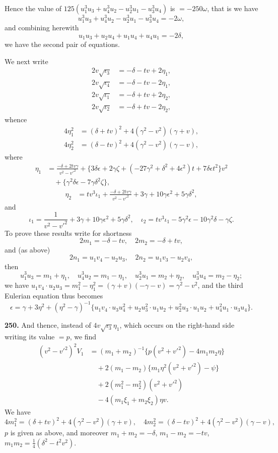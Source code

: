 \documentclass[12pt,a4paper]{article}
\theoremstyle{definition}
\begin{document}
Hence the value of $125(u_1^3u_3 + u_4^3u_2 - u_2^3u_1 - u_3^3u_4)$ is $= -250\omega$, that is we have
\[
u_1^3u_3 + u_4^3u_2 - u_2^3u_1 - u_3^3u_4 = -2\omega,\]
and combining herewith
\[
u_1u_3 + u_2u_4 + u_1u_4 + u_4u_1 = -2\delta,\]
we have the second pair of equations.

We next write
\begin{align*}
2v\sqrt{\iota_3} &= -\delta - tv + 2\eta_1,\\
2v\sqrt{\iota_4} &= -\delta - tv - 2\eta_1,\\
2v\sqrt{\iota_1} &= -\delta + tv + 2\eta_2,\\
2v\sqrt{\iota_2} &= -\delta + tv - 2\eta_2,
\end{align*}
whence
\begin{align*}
4\eta_1^2 &= (\delta + tv)^2 + 4(\gamma^2 - v^2)(\gamma + v),\\
4\eta_2^2 &= (\delta - tv)^2 + 4(\gamma^2 - v^2)(\gamma - v),
\end{align*}
where
\begin{align*}
\eta_1 &= \frac{-\delta + 2tv\gamma}{v^2 - v'^2} + \{3\delta\epsilon + 2\gamma\zeta + (-27\gamma^2 + \delta^2 + 4\epsilon^2)t + 7\delta\epsilon t^2\}v^2 \\
&\quad + \{\gamma^2\delta\epsilon - 7\gamma\delta^2\zeta\},
\end{align*}
\begin{align*}
\eta_2 &= tv^3\iota_1 + \frac{-\delta + 2tv\gamma}{v^2 - v'^2} + 3\gamma + 10\gamma\epsilon^2 + 5\gamma\delta^2,
\end{align*}
and
\[
\iota_1 = \frac{1}{v^2 - v'^2} + 3\gamma + 10\gamma\epsilon^2 + 5\gamma\delta^2,\quad
\iota_2 = tv^3\iota_1 - 5\gamma^2\epsilon - 10\gamma^2\delta - \gamma\zeta.
\]
To prove these results write for shortness
\[
2m_1 = -\delta - tv,\quad 2m_2 = -\delta + tv,
\]
and (as above)
\[
2n_1 = u_1v_4 - u_2u_3,\quad 2n_2 = u_1v_3 - u_2v_4,
\]
then
\[
u_1^3u_3 = m_1 + \eta_1,\quad u_4^3u_2 = m_1 - \eta_1,\quad u_2^3u_1 = m_2 + \eta_2,\quad u_3^3u_4 = m_2 - \eta_2;\]
we have $u_1v_4 \cdot u_2u_3 = m_1^2 - \eta_1^2 = (\gamma + v)(-\gamma - v) = \gamma^2 - v^2$, and the third Eulerian equation thus becomes
\[
\epsilon = \gamma + 3\eta^2 + (\eta^2 - \gamma)^{-1}\{u_1v_4 \cdot u_3u_4^2 + u_2u_3^2 \cdot u_1u_2 + u_2^2u_3 \cdot u_1u_2 + u_4^2u_1 \cdot u_3u_4\}.
\]

\vspace{0.5em}

\noindent\textbf{250.} And thence, instead of $4v\sqrt{\iota_3}\eta_1$, which occurs on the right-hand side writing its value $= p$, we find
\begin{align*}
(v^2 - v'^2)^2 V_1 &= (m_1 + m_2)^{-1}\{p(v^2 + v'^2) - 4m_1m_2\eta\} \\
&\quad + 2(m_1 - m_2)\{m_1\eta^2(v^2 + v'^2) - \psi\} \\
&\quad + 2(m_1^2 - m_2^2)(v^2 + v'^2) \\
&\quad - 4(m_1\xi_1 + m_2\xi_2)\eta v.
\end{align*}
We have
\[
4m_1^2 = (\delta + tv)^2 + 4(\gamma^2 - v^2)(\gamma + v),\quad 4m_2^2 = (\delta - tv)^2 + 4(\gamma^2 - v^2)(\gamma - v),
\]
$p$ is given as above, and moreover $m_1 + m_2 = -\delta$, $m_1 - m_2 = -tv$, $m_1m_2 = \frac{1}{4}(\delta^2 - t^2v^2)$.
\end{document}
